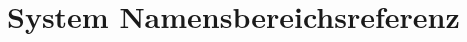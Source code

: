 \hypertarget{namespaceSystem}{
\section{System Namensbereichsreferenz}
\label{namespaceSystem}
}




